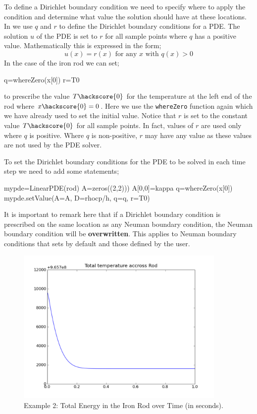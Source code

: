 To define a Dirichlet boundary condition we need to specify where to apply the
condition and determine what value the 
solution should have at these locations. In \esc we use $q$ and $r$ to define
the Dirichlet boundary conditions
for a PDE. The solution $u$ of the PDE is set to $r$ for all sample points where
$q$ has a positive value.
Mathematically this is expressed in the form;
\begin{equation}
  u(x) = r(x) \mbox{ for any } x \mbox{ with } q(x) > 0
\end{equation} 
In the case of the iron rod 
we can set;
\begin{python}
q=whereZero(x[0])
r=T0
\end{python}
to prescribe the value $T\hackscore{0}$ for the temperature at the left end of
the rod where $x\hackscore{0}=0$. 
Here we use the \verb|whereZero| function again which we have already used to
set the initial value.
Notice that $r$ is set to the constant value $T\hackscore{0}$ for all sample
points. In fact, 
values of $r$ are used only where $q$ is positive. Where $q$ is non-positive,
$r$ may have any value as these values are not used by the PDE solver. 

To set the Dirichlet boundary conditions for the PDE to be solved in each time
step we need
to add some statements;
\begin{python}
mypde=LinearPDE(rod)
A=zeros((2,2)))
A[0,0]=kappa
q=whereZero(x[0])
mypde.setValue(A=A, D=rhocp/h, q=q, r=T0)
\end{python}
It is important to remark here that if a Dirichlet boundary condition is
prescribed on the same location as any Neuman boundary condition, the Neuman
boundary condition will be  \textbf{overwritten}. This applies to Neuman
boundary conditions that \esc sets by default and those defined by the user.

\begin{figure}
\begin{center}
\includegraphics[width=4in]{figures/ttrodpyplot150}
\caption{Example 2: Total Energy in the Iron Rod over Time (in seconds).}
\label{fig:onedheatout1 002} 
\end{center}
\end{figure}

